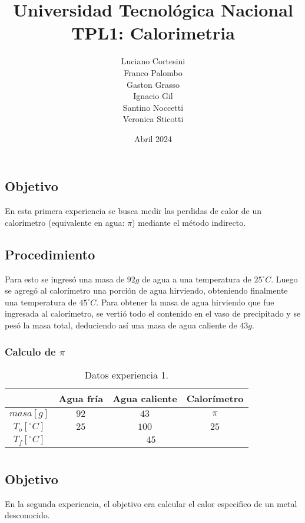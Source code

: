 \documentclass[12pt]{report}
\title{Universidad Tecnológica Nacional\\TPL1: Calorimetria}
\author{
Luciano Cortesini\\
Franco Palombo\\
Gaston Grasso\\
Ignacio Gil\\
Santino Noccetti\\
Veronica Sticotti
}
\date{Abril 2024}
\begin{document}
\maketitle

\chapter{}
\section{Objetivo}
En esta primera experiencia se busca medir las perdidas de calor de un calorímetro (equivalente en agua: $\pi$) mediante el método indirecto. 

\section{Procedimiento}
Para esto se ingresó una masa de $92 g$ de agua a una temperatura de $25^\circ C$.
Luego se agregó al calorímetro una porción de agua hirviendo, obteniendo finalmente una temperatura de  $45^\circ C$. 
Para obtener la masa de agua hirviendo que fue ingresada al calorímetro, se vertió todo el contenido en el vaso de precipitado y se pesó la masa total, deduciendo así una masa de agua caliente de $43g$.
\subsection{Calculo de $\pi$}
\begin{table}[htbp]
    \centering
    \begin{tabular}{|c|c|c|c|}
    \hline
    & Agua fría & Agua caliente & Calorímetro\\
    \hline
    $masa[g]$ & $92$ & $43$ & $\pi$ \\
    \hline
   $T_o[^\circ C]$ & $25$ & $100$ & $25$\\
    \hline
     $T_f[^\circ C]$ & \multicolumn{3}{|c|}{$45$}\\
    \hline
    \end{tabular}
    \caption{Datos experiencia 1.}
    \label{tab:datos experiencia 1}
\end{table}

\chapter{}
\section{Objetivo}
En la segunda experiencia, el objetivo era calcular el calor especifico de un metal desconocido.
\end{document}
